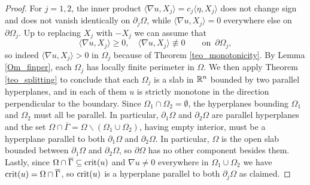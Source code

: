 \documentclass[10 pt,a4paper]{article}
\theoremstyle{definition}
\begin{document}
\begin{proof}
	For $j=1,2$, the inner product $\langle\nabla u,X_j\rangle = c_j\langle\eta,X_j\rangle$ does not change sign and does not vanish identically on $\partial_j\Omega$, while $\langle\nabla u,X_j\rangle = 0$ everywhere else on $\partial\Omega_j$. Up to replacing $X_j$ with $-X_j$ we can assume that
	\[
	\langle \nabla u, X_j \rangle \ge 0, \quad \langle \nabla u,X_j \rangle \not\equiv 0 \qquad \text{on } \, \partial \Omega_j, 
	\]
	so indeed $\langle\nabla u,X_j\rangle >0$ in $\Omega_j$ because of  Theorem \ref{teo_monotonicity}. By Lemma \ref{Om_finper}, each $\Omega_j$ has locally finite perimeter in $\Omega$. We then apply Theorem \ref{teo_splitting} to conclude that each $\Omega_j$ is a slab in $\mathbb R^n$ bounded by two parallel hyperplanes, and in each of them $u$ is strictly monotone in the direction perpendicular to the boundary. Since $\Omega_1 \cap \Omega_2 = \emptyset$, the hyperplanes bounding $\Omega_1$ and $\Omega_2$ must all be parallel. In particular, $\partial_1\Omega$ and $\partial_2\Omega$ are parallel hyperplanes and the set $\Omega\cap\overline{\Gamma} = \Omega \backslash (\Omega_1\cup\Omega_2)$, having empty interior, must be a hyperplane parallel to both $\partial_1\Omega$ and $\partial_2\Omega$. In particular, $\Omega$ is the open slab bounded between $\partial_1\Omega$ and $\partial_2\Omega$, so $\partial\Omega$ has no other component besides them. Lastly, since $\Omega\cap\overline{\Gamma}\subseteq{\rm crit}(u)$ and $\nabla u\neq 0$ everywhere in $\Omega_1\cup\Omega_2$ we have ${\rm crit}(u) = \Omega\cap\overline{\Gamma}$, so ${\rm crit}(u)$ is a hyperplane parallel to both $\partial_j\Omega$ as claimed.
\end{proof}
	
	
	
	
	
	
	
	
	
	
	 
\end{document}

